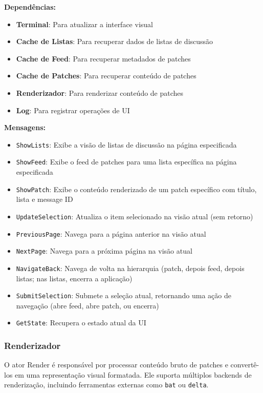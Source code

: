 \textbf{Dependências:}

\begin{itemize}
    \item \textbf{Terminal}: Para atualizar a interface visual
    \item \textbf{Cache de Listas}: Para recuperar dados de listas de discussão
    \item \textbf{Cache de Feed}: Para recuperar metadados de patches
    \item \textbf{Cache de Patches}: Para recuperar conteúdo de patches
    \item \textbf{Renderizador}: Para renderizar conteúdo de patches
    \item \textbf{Log}: Para registrar operações de UI
\end{itemize}

\textbf{Mensagens:}

\begin{itemize}
    \item \texttt{ShowLists}: Exibe a visão de listas de discussão na página especificada
    \item \texttt{ShowFeed}: Exibe o feed de patches para uma lista específica na página especificada
    \item \texttt{ShowPatch}: Exibe o conteúdo renderizado de um patch específico com título, lista e message ID
    \item \texttt{UpdateSelection}: Atualiza o item selecionado na visão atual (sem retorno)
    \item \texttt{PreviousPage}: Navega para a página anterior na visão atual
    \item \texttt{NextPage}: Navega para a próxima página na visão atual
    \item \texttt{NavigateBack}: Navega de volta na hierarquia (patch, depois feed, depois listas; nas listas, encerra a aplicação)
    \item \texttt{SubmitSelection}: Submete a seleção atual, retornando uma ação de navegação (abre feed, abre patch, ou encerra)
    \item \texttt{GetState}: Recupera o estado atual da UI
\end{itemize}

\subsubsection{Renderizador}

O ator Render é responsável por processar conteúdo bruto de patches e convertê-los em uma representação visual formatada. Ele suporta múltiplos backends de renderização, incluindo ferramentas externas como \texttt{bat} ou \texttt{delta}.

